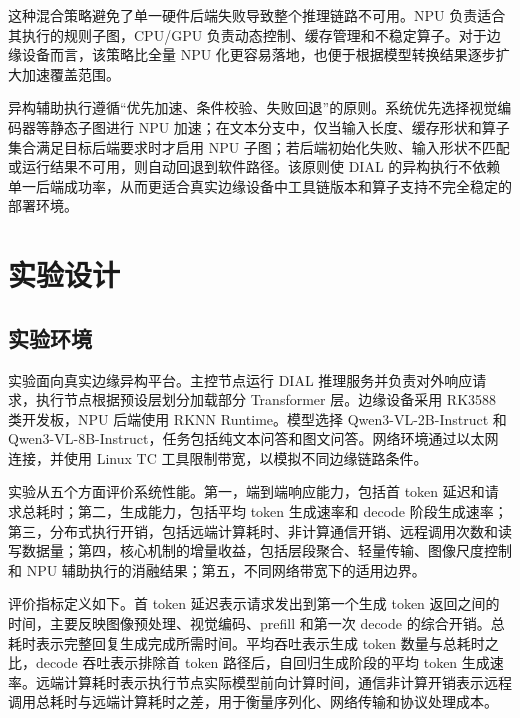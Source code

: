 \documentclass[10pt,a4paper,twocolumn]{ctexart}
\begin{document}
这种混合策略避免了单一硬件后端失败导致整个推理链路不可用。NPU 负责适合其执行的规则子图，CPU/GPU 负责动态控制、缓存管理和不稳定算子。对于边缘设备而言，该策略比全量 NPU 化更容易落地，也便于根据模型转换结果逐步扩大加速覆盖范围。

异构辅助执行遵循“优先加速、条件校验、失败回退”的原则。系统优先选择视觉编码器等静态子图进行 NPU 加速；在文本分支中，仅当输入长度、缓存形状和算子集合满足目标后端要求时才启用 NPU 子图；若后端初始化失败、输入形状不匹配或运行结果不可用，则自动回退到软件路径。该原则使 DIAL 的异构执行不依赖单一后端成功率，从而更适合真实边缘设备中工具链版本和算子支持不完全稳定的部署环境。

\section{实验设计}

\subsection{实验环境}

实验面向真实边缘异构平台。主控节点运行 DIAL 推理服务并负责对外响应请求，执行节点根据预设层划分加载部分 Transformer 层。边缘设备采用 RK3588 类开发板，NPU 后端使用 RKNN Runtime。模型选择 Qwen3-VL-2B-Instruct 和 Qwen3-VL-8B-Instruct，任务包括纯文本问答和图文问答。网络环境通过以太网连接，并使用 Linux TC 工具限制带宽，以模拟不同边缘链路条件。

实验从五个方面评价系统性能。第一，端到端响应能力，包括首 token 延迟和请求总耗时；第二，生成能力，包括平均 token 生成速率和 decode 阶段生成速率；第三，分布式执行开销，包括远端计算耗时、非计算通信开销、远程调用次数和读写数据量；第四，核心机制的增量收益，包括层段聚合、轻量传输、图像尺度控制和 NPU 辅助执行的消融结果；第五，不同网络带宽下的适用边界。

评价指标定义如下。首 token 延迟表示请求发出到第一个生成 token 返回之间的时间，主要反映图像预处理、视觉编码、prefill 和第一次 decode 的综合开销。总耗时表示完整回复生成完成所需时间。平均吞吐表示生成 token 数量与总耗时之比，decode 吞吐表示排除首 token 路径后，自回归生成阶段的平均 token 生成速率。远端计算耗时表示执行节点实际模型前向计算时间，通信非计算开销表示远程调用总耗时与远端计算耗时之差，用于衡量序列化、网络传输和协议处理成本。
\end{document}
